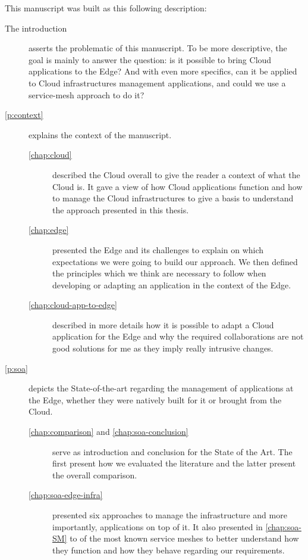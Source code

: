 This manuscript was built as this following description:
\begin{description}
\item[The introduction] asserts the problematic of this manuscript. To
  be more descriptive, the goal is mainly to answer the question: is
  it possible to bring Cloud applications to the Edge? And with even
  more specifics, can it be applied to Cloud infrastructures
  management applications, and could we use a service-mesh approach to
  do it?
\item [\autoref{p:context}] explains the context of the manuscript.
  \begin{description}
  \item [\autoref{chap:cloud}] described the Cloud overall to give the
    reader a context of what the Cloud is. It gave a view of how Cloud
    applications function and how to manage the Cloud infrastructures to
    give a basis to understand the approach presented in this thesis.
  \item[\autoref{chap:edge}] presented the Edge and its challenges to
    explain on which expectations we were going to build our
    approach. We then defined the principles which we think are
    necessary to follow when developing or adapting an application in
    the context of the Edge.
  \item[\autoref{chap:cloud-app-to-edge}] described in more details
    how it is possible to adapt a Cloud application for the Edge and
    why the required collaborations are not good solutions for me as
    they imply really intrusive changes.
  \end{description}
\item [\autoref{p:soa}] depicts the State-of-the-art regarding the
  management of applications at the Edge, whether they were natively
  built for it or brought from the Cloud.
  \begin{description}
  \item[\autoref{chap:comparison} \textnormal{and}
    \autoref{chap:soa-conclusion}] serve as introduction and conclusion
    for the State of the Art. The first present how we evaluated the
    literature and the latter present the overall comparison.
  \item[\autoref{chap:soa-edge-infra}] presented six approaches to
    manage the infrastructure and more importantly, applications on top
    of it. It also presented in \autoref{chap:soa-SM} to of the most
    known service meshes to better understand how they function and how
    they behave regarding our requirements.

\end{description}
\end{description}
